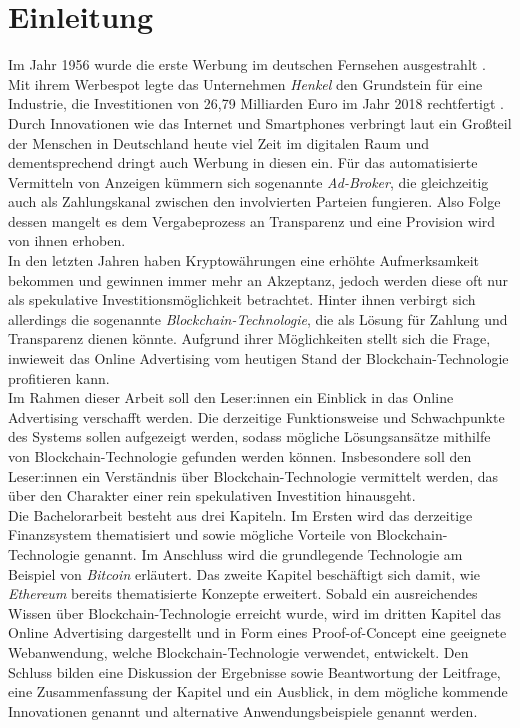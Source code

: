 \chapter{Einleitung}
Im Jahr 1956 wurde die erste Werbung im deutschen Fernsehen ausgestrahlt \cite{tagesspiegel_2016}. Mit ihrem Werbespot legte das Unternehmen \emph{Henkel} den Grundstein für eine Industrie, die Investitionen von 26,79 Milliarden Euro im Jahr 2018 rechtfertigt \cite{statista_werbung_2020}. Durch Innovationen wie das Internet und Smartphones verbringt laut \cite{statista_internetnutzung_2020} ein Großteil der Menschen in Deutschland heute viel Zeit im digitalen Raum und dementsprechend dringt auch Werbung in diesen ein. Für das automatisierte Vermitteln von Anzeigen kümmern sich sogenannte \emph{Ad-Broker}, die gleichzeitig auch als Zahlungskanal zwischen den involvierten Parteien fungieren. Also Folge dessen mangelt es dem Vergabeprozess an Transparenz und eine Provision wird von ihnen erhoben.\\

In den letzten Jahren haben Kryptowährungen eine erhöhte Aufmerksamkeit bekommen und gewinnen immer mehr an Akzeptanz, jedoch werden diese oft nur als spekulative Investitionsmöglichkeit betrachtet. Hinter ihnen verbirgt sich allerdings die sogenannte \emph{Blockchain-Technologie}, die als Lösung für Zahlung und Transparenz dienen könnte. Aufgrund ihrer Möglichkeiten stellt sich die Frage, inwieweit das Online Advertising vom heutigen Stand der Blockchain-Technologie profitieren kann.\\

Im Rahmen dieser Arbeit soll den Leser:innen ein Einblick in das Online Advertising verschafft werden. Die derzeitige Funktionsweise und Schwachpunkte des Systems sollen aufgezeigt werden, sodass mögliche Lösungsansätze mithilfe von Blockchain-Technologie gefunden werden können. Insbesondere soll den Leser:innen ein Verständnis über Blockchain-Technologie vermittelt werden, das über den Charakter einer rein spekulativen Investition hinausgeht.\\

Die Bachelorarbeit besteht aus drei Kapiteln. Im Ersten wird das derzeitige Finanzsystem thematisiert und sowie mögliche Vorteile von Blockchain-Technologie genannt. Im Anschluss wird die grundlegende Technologie am Beispiel von \emph{Bitcoin} erläutert. Das zweite Kapitel beschäftigt sich damit, wie \emph{Ethereum} bereits thematisierte Konzepte erweitert. Sobald ein ausreichendes Wissen über Blockchain-Technologie erreicht wurde, wird im dritten Kapitel das Online Advertising dargestellt und in Form eines Proof-of-Concept eine geeignete Webanwendung, welche Blockchain-Technologie verwendet, entwickelt. Den Schluss bilden eine Diskussion der Ergebnisse sowie Beantwortung der Leitfrage, eine Zusammenfassung der Kapitel und ein Ausblick, in dem mögliche kommende Innovationen genannt und alternative Anwendungsbeispiele genannt werden. 

